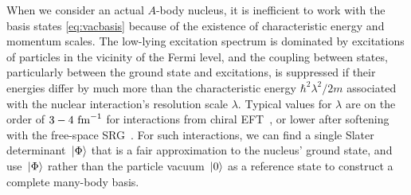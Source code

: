 When we consider an actual $A$-body nucleus, it is inefficient to work with the basis states \eqref{eq:vacbasis} because of the existence of characteristic energy and momentum scales. The low-lying excitation spectrum is dominated by excitations of particles in the vicinity of the Fermi level, and the coupling between states, particularly between the ground state and excitations, is suppressed if their energies differ by much more than the characteristic energy $\hbar^2\lambda^2/2m$ associated with the nuclear interaction's resolution scale $\lambda$. Typical values for $\lambda$ are on the order of $3-4\,\,\text{fm}^{-1}$ for interactions from chiral EFT~\cite{Epelbaum:2009ve}, or lower after softening with the free-space SRG~\cite{Bogner:2010pq}. For such interactions, we can find a single Slater determinant $\,|{\Phi}\rangle$ that is a fair approximation to the nucleus' ground state, and use $\,|{\Phi}\rangle$ rather than the particle vacuum $\,|{0}\rangle$ as a reference state to construct a complete many-body basis.

